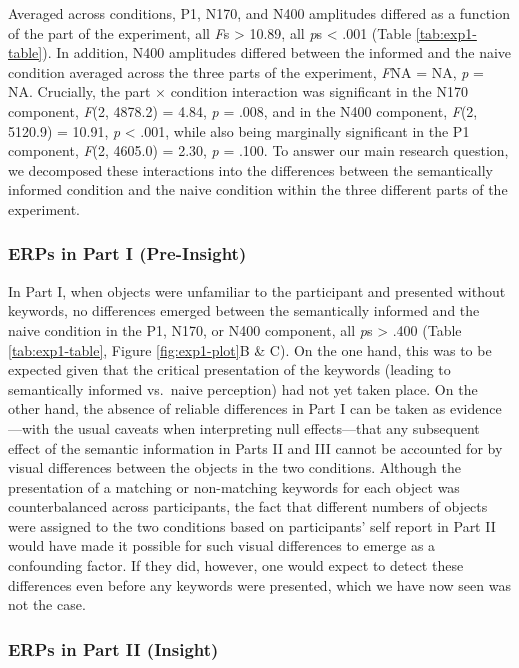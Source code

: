\documentclass[
  english,
  man,11pt,floatsintext]{apa7}
\begin{document}
Averaged across conditions, P1, N170, and N400 amplitudes differed as a function of the part of the experiment, all \emph{F}s \textgreater{} 10.89, all \emph{p}s \textless{} .001 (Table \ref{tab:exp1-table}). In addition, N400 amplitudes differed between the informed and the naive condition averaged across the three parts of the experiment, \emph{F}NA = NA, \emph{p} = NA. Crucially, the part × condition interaction was significant in the N170 component, \emph{F}(2, 4878.2) = 4.84, \emph{p} = .008, and in the N400 component, \emph{F}(2, 5120.9) = 10.91, \emph{p} \textless{} .001, while also being marginally significant in the P1 component, \emph{F}(2, 4605.0) = 2.30, \emph{p} = .100. To answer our main research question, we decomposed these interactions into the differences between the semantically informed condition and the naive condition within the three different parts of the experiment.

\hypertarget{erps-in-part-i-pre-insight}{%
\subsubsection{ERPs in Part I (Pre-Insight)}\label{erps-in-part-i-pre-insight}}

In Part I, when objects were unfamiliar to the participant and presented without keywords, no differences emerged between the semantically informed and the naive condition in the P1, N170, or N400 component, all \emph{p}s \textgreater{} .400 (Table \ref{tab:exp1-table}, Figure \ref{fig:exp1-plot}B \& C). On the one hand, this was to be expected given that the critical presentation of the keywords (leading to semantically informed vs.~naive perception) had not yet taken place. On the other hand, the absence of reliable differences in Part I can be taken as evidence---with the usual caveats when interpreting null effects---that any subsequent effect of the semantic information in Parts II and III cannot be accounted for by visual differences between the objects in the two conditions. Although the presentation of a matching or non-matching keywords for each object was counterbalanced across participants, the fact that different numbers of objects were assigned to the two conditions based on participants' self report in Part II would have made it possible for such visual differences to emerge as a confounding factor. If they did, however, one would expect to detect these differences even before any keywords were presented, which we have now seen was not the case.

\hypertarget{erps-in-part-ii-insight}{%
\subsubsection{ERPs in Part II (Insight)}\label{erps-in-part-ii-insight}}
\end{document}
